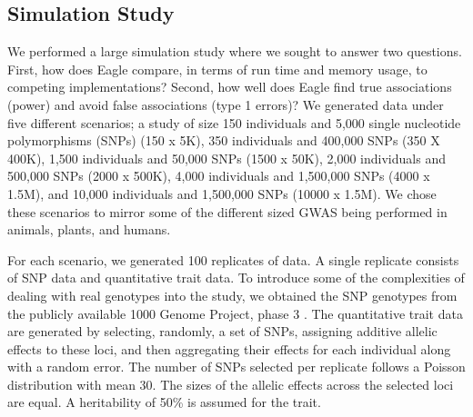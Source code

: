 \documentclass{nature}
\begin{document}
 

\subsection{Simulation Study}
We performed a large simulation study where we sought to  answer two questions. 
First, how does Eagle compare, in terms of run time and memory usage, to 
competing implementations? Second, how well does Eagle find true associations (power) and avoid 
false associations (type 1 errors)? We generated data under five different scenarios; a study of size 150 individuals 
and 5,000 single nucleotide polymorphisms (SNPs) (150 x 5K),  350 individuals and 400,000 SNPs (350 X 400K),  1,500 individuals and 
50,000 SNPs (1500 x 50K), 2,000 individuals and 500,000 SNPs (2000 x 500K), 4,000 individuals and 
1,500,000 SNPs (4000 x 1.5M), and 10,000 individuals and 1,500,000 SNPs (10000 x 1.5M).   
We chose these scenarios to mirror some of the different sized GWAS being performed in animals, plants, and humans. 

For each scenario, we generated 100 replicates of data. A single replicate consists of SNP data and quantitative trait data. 
To introduce some of the complexities of dealing with real genotypes into the study, we obtained the SNP genotypes from 
the publicly available 1000 Genome Project, phase 3  \cite{10002010map}.  The quantitative trait data are generated 
by selecting, randomly, a set of SNPs, assigning additive allelic effects to these loci, and then aggregating their effects for 
each individual along with a random error.  
 The number of SNPs selected per replicate follows a Poisson distribution with mean 30. The sizes of the allelic effects 
 across the selected loci are equal.  A heritability of  50\% is assumed for the trait. 
 
\end{document}
